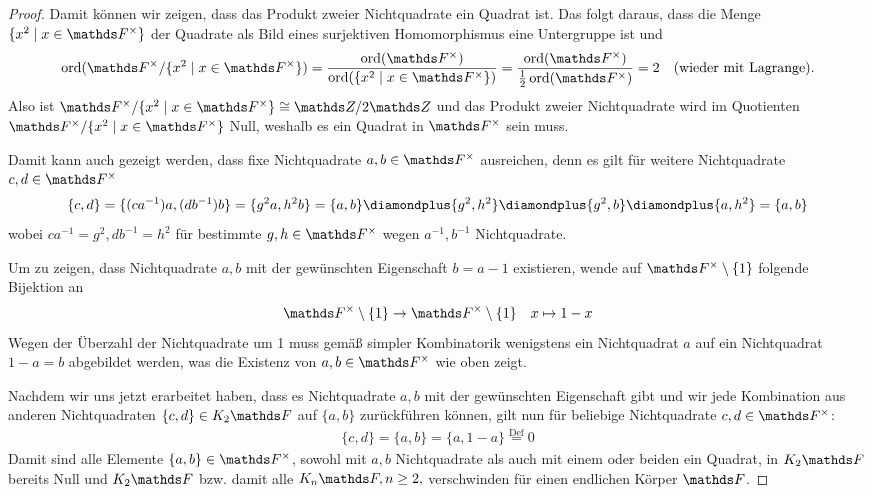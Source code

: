 \documentclass[ngerman,fontsize=11pt, paper=a4, parskip=half, titlepage=true, toc=bib]{scrartcl}
\begin{document}
\begin{Lem}
\begin{proof}
    Damit können wir zeigen, dass das Produkt zweier Nichtquadrate ein
    Quadrat ist. Das folgt daraus, dass  die Menge 
    $\{x^2\mid x\in\Fx\}$ der Quadrate 
    als Bild eines surjektiven Homomorphismus eine Untergruppe ist und 
    \begin{gather*}
      \Ord(\Fx/\{x^2\mid x\in\Fx\})
      =\frac{\Ord(\Fx)}{\Ord(\{x^2\mid x\in\Fx\})}
      =\frac{\Ord(\Fx)}{\frac{1}{2}\Ord(\Fx)}=2
      \quad\text{(wieder mit Lagrange).}
    \end{gather*} 
    Also ist $\Fx/\{x^2\mid x\in\Fx\}\cong \Z/2\Z$ und das Produkt 
    zweier Nichtquadrate wird im Quotienten
    $\Fx/\{x^2\mid x\in\Fx\}$ Null, weshalb es ein Quadrat in $\Fx$
    sein muss.

    Damit kann auch gezeigt werden, dass fixe Nichtquadrate $a,b\in\Fx$
    ausreichen, denn es gilt für weitere Nichtquadrate $c,d\in\Fx$
    \begin{gather*}
      \{c,d\}=\{(ca^{-1})a,(db^{-1})b\}=\{g^2a,h^2b\}
      =\{a,b\}\p\{g^2,h^2\}\p\{g^2,b\}\p\{a,h^2\}
      =\{a,b\}
    \end{gather*}
    wobei $ca^{-1}=g^2,db^{-1}=h^2$ für bestimmte $g,h\in\Fx$
    wegen $a^{-1},b^{-1}$ Nichtquadrate.

    Um zu zeigen, dass Nichtquadrate $a,b$ mit der gewünschten
    Eigenschaft $b=a-1$ existieren, wende auf $\Fx\setminus\{1\}$ 
    folgende Bijektion an
    \begin{align*}
      \Fx\setminus\{1\}&\to \Fx\setminus\{1\}
      &x\mapsto 1-x
    \end{align*}
    Wegen der Überzahl der Nichtquadrate um 1 muss gemäß simpler
    Kombinatorik wenigstens ein Nichtquadrat $a$  auf ein Nichtquadrat
    $1-a=b$ abgebildet werden, was die Existenz
    von $a,b\in\Fx$ wie oben zeigt.

    Nachdem wir uns jetzt erarbeitet haben, dass es Nichtquadrate
    $a,b$ mit der gewünschten Eigenschaft gibt und wir jede
    Kombination aus anderen Nichtquadraten $\{c,d\}\in\K_2\F$ 
    auf $\{a,b\}$ zurückführen können,
    gilt nun für beliebige Nichtquadrate $c,d\in\Fx$:
    \begin{gather*}
      \{c,d\}=\{a,b\}=\{a,1-a\} \overset{\text{Def}}{=} 0
    \end{gather*}
    Damit sind alle Elemente $\{a,b\}\in\Fx$, sowohl mit $a,b$
    Nichtquadrate als auch mit einem oder beiden ein Quadrat, 
    in $\K_2\F$ bereits Null und $\K_2\F$
    bzw. damit alle $\K_n\F,n\geq 2,$ verschwinden für einen endlichen
    Körper $\F$.
  \end{proof}
\end{Lem}
\end{document}
